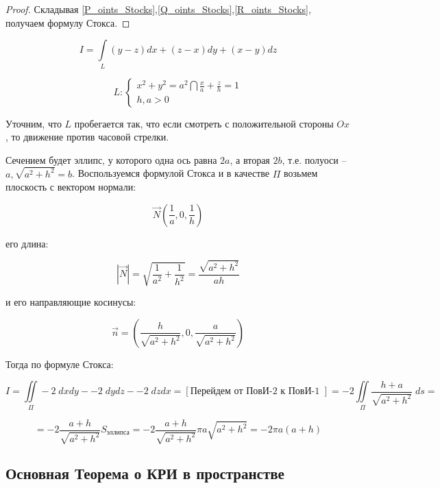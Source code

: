 \documentclass[../../main.tex]{subfiles}
\begin{document}
\begin{theorem}
\begin{proof}
			Складывая \eqref{P_oints_Stocks},\eqref{Q_oints_Stocks},\eqref{R_oints_Stocks}, получаем формулу Стокса.
			 
		\end{proof}	
	\end{theorem}
			
			
			\begin{example}
				\[ I = \int \limits_L \left( y-z \right) dx + \left( z-x \right) dy + \left( x-y \right) dz  \]
				
				\[ L: \begin{cases}
					x^2 + y^2 = a^2 \bigcap \frac{x}{a} + \frac{z}{h} = 1 \\
					h,a > 0 
				   \end{cases}
				 \]
				
		
			Уточним, что $L$ пробегается так, что если смотреть с положительной стороны $Ox$, то движение против часовой стрелки.
			
			
			Сечением будет эллипс, у которого одна ось равна $2a$, а вторая $2b$, т.е. полуоси \--- $a, \sqrt{a^2 + h^2} = b$. Воспользуемся формулой Стокса и в качестве $\Pi$ возьмем плоскость с вектором нормали:
			
			\[ \vec{N}\left( \frac{1}{a}, 0 , \frac{1}{h} \right)  \]
			
			его длина:
			
			\[ \left| \vec{N} \right|= \sqrt{\frac{1}{a^2} + \frac{1}{h^2} } = \frac{\sqrt{a^2 + h^2}}{ah}  \]
			
			и его направляющие косинусы:
			
			\[ \vec{n} = \left( \frac{h}{\sqrt{a^2 + h^2}}, 0, \frac{a}{\sqrt{a^2 + h^2}} \right)      \]
			
			Тогда по формуле Стокса:
			
			\[ I = \iint \limits_{\Pi} -2 \; dxdy - -2 \; dydz - -2 \; dzdx = \left[ \text{Перейдем от ПовИ-2 к ПовИ-1 } \right] = -2 \iint \limits_{\Pi} \frac{h+a}{\sqrt{a^2 + h^2}}  \; ds =        \]
			
			\[ = -2\frac{a+h}{\sqrt{a^2 + h^2}}  S_{\text{эллипса}} = -2\frac{a+h}{\sqrt{a^2 + h^2}} \pi a \sqrt{a^2 + h^2} = -2 \pi a \left( a+h \right)       \]
			
		\end{example}
			
		\subsection{Основная Теорема о КРИ в пространстве}
		
\end{document}
